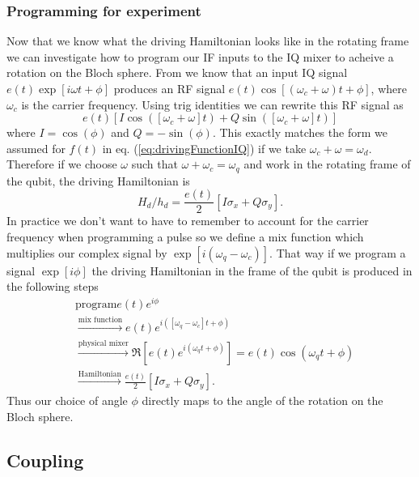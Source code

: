 \subsubsection{Programming for experiment}

Now that we know what the driving Hamiltonian looks like in the rotating frame we can investigate how to program our IF inputs to the IQ mixer to acheive a rotation on the Bloch sphere.
From  we know that an input IQ signal $e(t)\exp\left[i\omega t + \phi\right]$ produces an RF signal $ e(t)\cos\left[(\omega_c+\omega)t + \phi \right]$, where $\omega_c$ is the carrier frequency. Using trig identities we can rewrite this RF signal as \begin{equation}
e(t) \left[ I\cos(\left[\omega_c+\omega\right] t) + Q\sin(\left[\omega_c+\omega\right]t)\right] \nonumber \end{equation}
where $I=\cos(\phi)$ and $Q=-\sin(\phi)$.
This exactly matches the form we assumed for $f(t)$ in eq. (\ref{eq:drivingFunctionIQ}) if we take $\omega_c + \omega = \omega_d$.
Therefore if we choose $\omega$ such that $\omega + \omega_c = \omega_q$ and work in the rotating frame of the qubit, the driving Hamiltonian is \begin{equation}
H_d/h_d = \frac{e(t)}{2}\left[I\sigma_x + Q\sigma_y\right]. \end{equation}
In practice we don't want to have to remember to account for the carrier frequency when programming a pulse so we define a mix function which multiplies our complex signal by $\exp\left[i(\omega_{q} - \omega_c)\right]$.
That way if we program a signal $\exp\left[i\phi\right]$ the driving Hamiltonian in the frame of the qubit is produced in the following steps \begin{align}
&\textrm{program} e(t) e^{i\phi} \nonumber \\
&\stackrel{\textrm{mix function}}{\longrightarrow} e(t) e^{i([\omega_q-\omega_c]t + \phi)} \nonumber \\
&\stackrel{\textrm{physical mixer}}{\longrightarrow} \Re \left[ e(t) e^{i(\omega_q t + \phi)} \right] = e(t) \cos\left(\omega_q t + \phi \right) \nonumber \\
&\stackrel{\textrm{Hamiltonian}}{\longrightarrow} \frac{e(t)}{2}\left[ I \sigma_x + Q \sigma_y \right]. \nonumber
\end{align}
Thus our choice of angle $\phi$ directly maps to the angle of the rotation on the Bloch sphere.

\subsection{Coupling}

